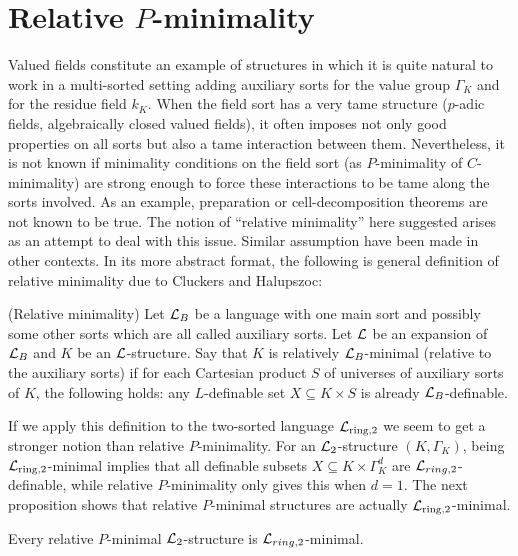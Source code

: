 \section{Relative $P$-minimality} \label{sec:relativity}

Valued fields constitute an example of structures in which it is quite natural to work in a multi-sorted setting adding auxiliary sorts for the value group $\Gamma_K$ and for the residue field $k_K$. When the field sort has a very tame structure ($p$-adic fields, algebraically closed valued fields), it often imposes not only good properties on all sorts but also a tame interaction between them. Nevertheless, it is not known if minimality conditions on the field sort (as $P$-minimality of $C$-minimality) are strong enough to force these interactions to be tame along the sorts involved. As an example, preparation or cell-decomposition theorems are not known to be true. The notion of ``relative minimality'' here suggested arises as an attempt to deal with this issue. Similar assumption have been made in other contexts.  In its more abstract format, the following is general definition of relative minimality due to Cluckers and Halupszoc:

\begin{defn}(Relative minimality)\label{def:relmini}
Let $\mathcal{L}_B$ be a language with one main sort and possibly some other sorts which are all called auxiliary sorts. Let $\mathcal{L}$ be an expansion of $\mathcal{L}_B$ and $K$ be an $\mathcal{L}$-structure. Say that $K$ is relatively $\mathcal{L}_B$-minimal (relative to the auxiliary sorts) if for each Cartesian product $S$ of
universes of auxiliary sorts of $K$, the following holds:
any $L$-definable set $X\subseteq K\times S$ is already $\mathcal{L}_B$-definable.
\end{defn}

If we apply this definition to the two-sorted language $\mathcal{L}_{\text{ring,2}}$ we seem to get a stronger notion than relative $P$-minimality. For an $\mathcal{L}_2$-structure $(K,\Gamma_K)$, being $\mathcal{L}_{\text{ring,2}}$-minimal implies that all definable subsets $X\subseteq K\times\Gamma_K^d$ are $\mathcal{L}_{ring,2}$-definable, while relative $P$-minimality only gives this when $d=1$. The next proposition shows that relative $P$-minimal structures are actually $\mathcal{L}_{\text{ring,2}}$-minimal. 

\begin{prop}\label{l=1} Every relative $P$-minimal $\mathcal{L}_2$-structure is $\mathcal{L}_{ring,2}$-minimal. 
\end{prop}

